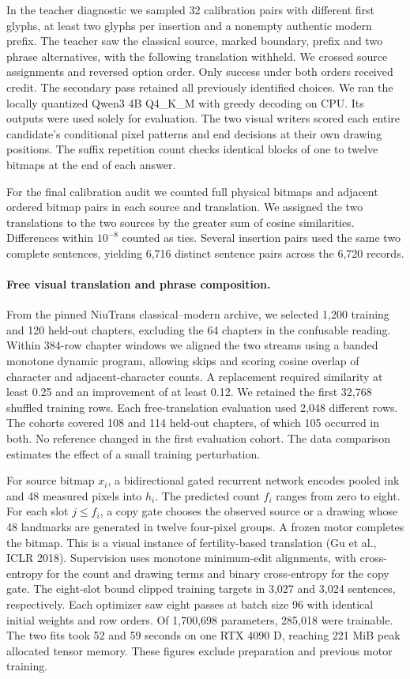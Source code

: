 \documentclass[12pt,a4paper]{article}
\providecommand{\DIFadd}[1]{{\protect\color{blue} \sf #1}} %
\begin{document}
\DIFadd{In the teacher diagnostic we sampled 32 calibration pairs with different first glyphs, at least two glyphs per insertion and a nonempty authentic modern prefix. The teacher saw the classical source, marked boundary, prefix and two phrase alternatives, with the following translation withheld. We crossed source assignments and reversed option order. Only success under both orders received credit. The secondary pass retained all previously identified choices. We ran the locally quantized Qwen3 4B Q4\_K\_M with greedy decoding on CPU. Its outputs were used solely for evaluation. The two visual writers scored each entire candidate's conditional pixel patterns and end decisions at their own drawing positions. The suffix repetition count checks identical blocks of one to twelve bitmaps at the end of each answer.
}

\DIFadd{For the final calibration audit we counted full physical bitmaps and adjacent ordered bitmap pairs in each source and translation. We assigned the two translations to the two sources by the greater sum of cosine similarities. Differences within $10^{-8}$ counted as ties. Several insertion pairs used the same two complete sentences, yielding 6,716 distinct sentence pairs across the 6,720 records.
}

\paragraph{\DIFadd{Free visual translation and phrase composition.}}
\DIFadd{From the pinned NiuTrans classical--modern archive, we selected 1,200 training and 120 held-out chapters, excluding the 64 chapters in the confusable reading. Within 384-row chapter windows we aligned the two streams using a banded monotone dynamic program, allowing skips and scoring cosine overlap of character and adjacent-character counts. A replacement required similarity at least 0.25 and an improvement of at least 0.12. We retained the first 32,768 shuffled training rows. Each free-translation evaluation used 2,048 different rows. The cohorts covered 108 and 114 held-out chapters, of which 105 occurred in both. No reference changed in the first evaluation cohort. The data comparison estimates the effect of a small training perturbation.
}

\DIFadd{For source bitmap $x_i$, a bidirectional gated recurrent network encodes pooled ink and 48 measured pixels into $h_i$. The predicted count $f_i$ ranges from zero to eight. For each slot $j\le f_i$, a copy gate chooses the observed source or a drawing whose 48 landmarks are generated in twelve four-pixel groups. A frozen motor completes the bitmap. This is a visual instance of fertility-based translation \textup{(Gu et al., ICLR 2018)}. Supervision uses monotone minimum-edit alignments, with cross-entropy for the count and drawing terms and binary cross-entropy for the copy gate. The eight-slot bound clipped training targets in 3,027 and 3,024 sentences, respectively. Each optimizer saw eight passes at batch size 96 with identical initial weights and row orders. Of 1,700,698 parameters, 285,018 were trainable. The two fits took 52 and 59 seconds on one RTX 4090 D, reaching 221 MiB peak allocated tensor memory. These figures exclude preparation and previous motor training.
}
\end{document}
